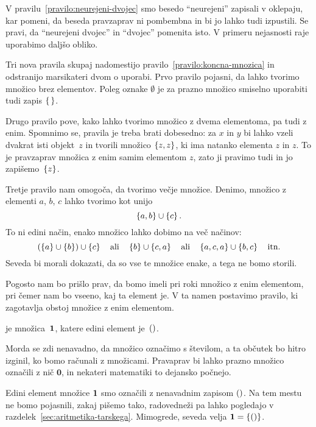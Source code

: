 V pravilu~\ref{pravilo:neurejeni-dvojec} smo besedo ``neurejeni'' zapisali v oklepaju, kar
pomeni, da beseda pravzaprav ni pombembna in bi jo lahko tudi izpustili. Se pravi, da
``neurejeni dvojec'' in ``dvojec'' pomenita isto. V primeru nejasnosti raje uporabimo
daljšo obliko.

Tri nova pravila skupaj nadomestijo pravilo~\ref{pravilo:koncna-mnozica} in odstranijo
marsikateri dvom o uporabi. Prvo pravilo pojasni, da lahko tvorimo množico brez elementov.
Poleg oznake $\emptyset$ je za prazno množico smiselno uporabiti tudi zapis $\set{\,}$.

Drugo pravilo pove, kako lahko tvorimo množico z dvema elementoma, pa tudi z enim.
Spomnimo se, pravila je treba brati dobesedno: za $x$ in $y$ bi lahko vzeli dvakrat isti
objekt~$z$ in tvorili množico $\set{z, z}$, ki ima natanko elementa $z$ in $z$. To je
pravzaprav množica z enim samim elementom $z$, zato ji pravimo tudi  in jo
zapišemo~$\set{z}$.

Tretje pravilo nam omogoča, da tvorimo večje množice. Denimo, množico z elementi $a$, $b$,
$c$ lahko tvorimo kot unijo
%
\begin{equation*}
  \set{a, b} \cup \set{c}.
\end{equation*}
%
To ni edini način, enako množico lahko dobimo na več načinov:
%
\begin{equation*}
  (\set{a} \cup \set{b}) \cup \set{c}
  \quad\text{ali}\quad
  \set{b} \cup \set{c, a}
  \quad\text{ali}\quad
  \set{a,c,a} \cup \set{b,c}
  \quad\text{itn.}
\end{equation*}
%
Seveda bi morali dokazati, da so vse te množice enake, a tega ne bomo storili.

Pogosto nam bo prišlo prav, da bomo imeli pri roki množico z enim elementom, pri čemer nam
bo vseeno, kaj ta element je. V ta namen postavimo pravilo, ki zagotavlja obstoj množice z
enim elementom.

\begin{pravilo}
  \label{pravilo:enojec}
   je množica~$\mathtt{\mathbf{1}}$, katere edini element je~$\mathord{()}$.
\end{pravilo}

Morda se zdi nenavadno, da množico označimo s številom, a ta občutek bo hitro izginil, ko
bomo računali z množicami. Pravaprav bi lahko prazno množico označili z nič $\mathbf{0}$,
in nekateri matematiki to dejansko počnejo.

Edini element množice $\mathtt{\mathbf{1}}$ smo označili z nenavadnim zapisom $\mathord{()}$. Na tem mestu ne
bomo pojasnili, zakaj pišemo tako, radovedneži pa lahko pogledajo v
razdelek~\ref{sec:aritmetika-tarskega}. Mimogrede, seveda velja $\one = \set{\unit}$.

